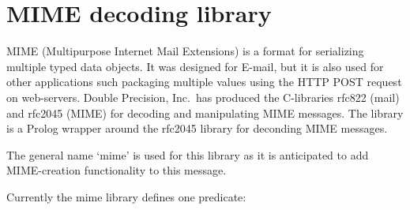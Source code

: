 \documentclass[11pt]{article}
\begin{document}
\section{MIME decoding library}

MIME (Multipurpose Internet Mail Extensions) is a format for serializing
multiple typed data objects.  It was designed for E-mail, but it is also
used for other applications such packaging multiple values using the
HTTP POST request on web-servers.  Double Precision, Inc.\ has produced
the C-libraries rfc822 (mail) and rfc2045 (MIME) for decoding and
manipulating MIME messages. The  library is a Prolog wrapper
around the rfc2045 library for deconding MIME messages.	

The general name `mime' is used for this library as it is anticipated to
add MIME-creation functionality to this message.

Currently the mime library defines one predicate:
\end{document}
